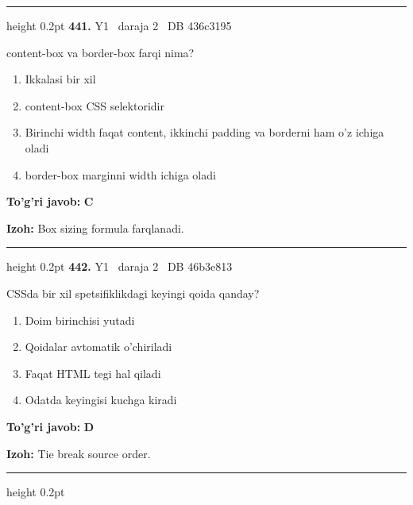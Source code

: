 \documentclass[10pt,a4paper,oneside]{article}
\begin{document}
\vspace{2mm}\hrule height 0.2pt \vspace{4mm}
\hypertarget{q441}{\textbf{\color{ink}441.}}  {\color{muted}\scriptsize Y1 \textbullet\ daraja 2 \textbullet\ DB 436c3195}
\par
content-box va border-box farqi nima?
\begin{enumerate}[label=\Alph*),leftmargin=9mm]
\item Ikkalasi bir xil
\item content-box CSS selektoridir
\item Birinchi width faqat content, ikkinchi padding va borderni ham o'z ichiga oladi
\item border-box marginni width ichiga oladi
\end{enumerate}
\begin{tcolorbox}[enhanced,breakable,colback=teal!4,colframe=teal!45!black,boxrule=0.45pt,arc=1.2mm,left=2.8mm,right=2.8mm,top=2mm,bottom=2mm,before skip=2mm,after skip=2mm]
\textbf{\color{teal}To'g'ri javob:} \textbf{C}
\par\smallskip
\textbf{Izoh:} Box sizing formula farqlanadi.
\end{tcolorbox}
\vspace{2mm}\hrule height 0.2pt \vspace{4mm}
\hypertarget{q442}{\textbf{\color{ink}442.}}  {\color{muted}\scriptsize Y1 \textbullet\ daraja 2 \textbullet\ DB 46b3e813}
\par
CSSda bir xil spetsifiklikdagi keyingi qoida qanday?
\begin{enumerate}[label=\Alph*),leftmargin=9mm]
\item Doim birinchisi yutadi
\item Qoidalar avtomatik o'chiriladi
\item Faqat HTML tegi hal qiladi
\item Odatda keyingisi kuchga kiradi
\end{enumerate}
\begin{tcolorbox}[enhanced,breakable,colback=teal!4,colframe=teal!45!black,boxrule=0.45pt,arc=1.2mm,left=2.8mm,right=2.8mm,top=2mm,bottom=2mm,before skip=2mm,after skip=2mm]
\textbf{\color{teal}To'g'ri javob:} \textbf{D}
\par\smallskip
\textbf{Izoh:} Tie break source order.
\end{tcolorbox}
\vspace{2mm}\hrule height 0.2pt \vspace{4mm}
\end{document}
